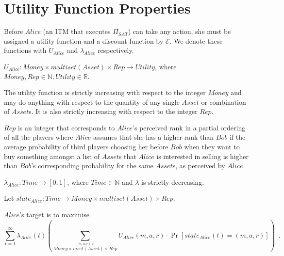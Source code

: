 \section{Utility Function Properties}
  Before $Alice$ (an ITM that executes $\Pi_{SAT}$) can take any action, she must be
  assigned a utility function and a discount function by $\mathcal{E}$. We denote these
  functions with $U_{Alice}$ and $\lambda_{Alice}$ respectively.
  \begin{definition}
    $U_{Alice} : Money \times multiset\left(Asset\right) \times Rep \rightarrow
    Utility$, where $Money, Rep \in \mathbb{N}, Utility \in \mathbb{R}$.
  \end{definition}
  The utility function is strictly increasing with respect to the integer $Money$ and may
  do anything with respect to the quantity of any single $Asset$ or combination of
  $Asset$s. It is also strictly increasing with respect to the integer $Rep$.

  $Rep$ is an integer that corresponds to $Alice$'s perceived rank in a partial ordering
  of all the players where $Alice$ assumes that she has a higher rank than $Bob$ if the
  average probability of third players choosing her before $Bob$ when they want to buy
  something amongst a list of $Asset$s that $Alice$ is interested in selling is higher
  than $Bob$'s corresponding probability for the same $Asset$s, as perceived by $Alice$.

  \begin{definition}
    $\lambda_{Alice} : Time \rightarrow \left[0, 1\right]$, where $Time \in \mathbb{N}$
    and $\lambda$ is strictly decreasing.
  \end{definition}
  \begin{definition}[State]
  Let $state_{Alice} : Time \rightarrow Money \times multiset\left(Asset\right) \times
  Rep$.
  \end{definition}
  $Alice$'s target is to maximise
  \begin{equation*}
    \sum\limits_{t = 1}^{\infty}
    \lambda_{Alice}\left(t\right)\left(\sum\limits_{\overset{\left(m, a, r\right)
    \in}{Money \times mset\left(Asset\right) \times Rep}} U_{Alice}\left(m, a,
    r\right) \cdot \Pr\left[state_{Alice}\left(t\right) = \left(m, a,
    r\right)\right]\right) \enspace.
  \end{equation*}
